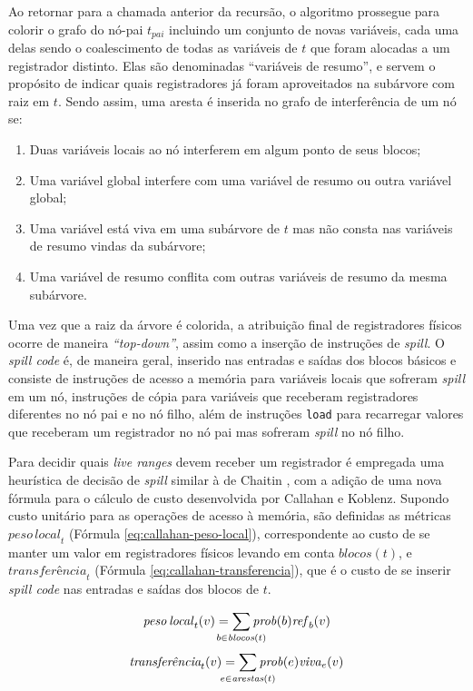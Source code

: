 \documentclass[
	12pt,				%
	openright,			%
	twoside,			%
	a4paper,			%
	tcc,			%
	]{ABNT-DC-UEL}
\begin{document}
Ao retornar para a chamada anterior da recursão, o algoritmo prossegue para colorir o grafo do nó-pai $t_{pai}$ incluindo um conjunto de novas variáveis, cada uma delas sendo o coalescimento de todas as variáveis de $t$ que foram alocadas a um registrador distinto. Elas são denominadas ``variáveis de resumo'', e servem o propósito de indicar quais registradores já foram aproveitados na subárvore com raiz em $t$. Sendo assim, uma aresta é inserida no grafo de interferência de um nó se:
\begin{enumerate}
    \item Duas variáveis locais ao nó interferem em algum ponto de seus blocos;
    \item Uma variável global interfere com uma variável de resumo ou outra variável global;
    \item Uma variável está viva em uma subárvore de $t$ mas não consta nas variáveis de resumo vindas da subárvore;
    \item Uma variável de resumo conflita com outras variáveis de resumo da mesma subárvore.
\end{enumerate}

Uma vez que a raiz da árvore é colorida, a atribuição final de registradores  físicos ocorre de maneira \textit{``top-down''}, assim como a inserção de instruções de \textit{spill}. O \textit{spill code} é, de maneira geral, inserido nas entradas e saídas dos blocos básicos e consiste de instruções de acesso a memória para variáveis locais que sofreram \textit{spill} em um nó, instruções de cópia para variáveis que receberam registradores diferentes no nó pai e no nó filho, além de instruções \texttt{load} para recarregar valores que receberam um registrador no nó pai mas sofreram \textit{spill} no nó filho.

Para decidir quais \textit{live ranges} devem receber um registrador é empregada uma heurística de decisão de \textit{spill} similar à de Chaitin \cite{chaitin:82}, com a adição de uma nova fórmula para o cálculo de custo desenvolvida por Callahan e Koblenz. Supondo custo unitário para as operações de acesso à memória, são definidas as métricas $\mathit{peso\,local}_t$ (Fórmula \ref{eq:callahan-peso-local}), correspondente ao custo de se manter um valor em registradores físicos levando em conta $\mathit{blocos}(t)$, e $\textit{transferência}_t$ (Fórmula \ref{eq:callahan-transferencia}), que é o custo de se inserir \textit{spill code} nas entradas e saídas dos blocos de $t$.

\begin{equation}
    \mathit{peso\,local}_t(v) = \sum_{\mathclap{b \in \mathit{blocos}(t)}} \mathit{prob}(b) \mathit{ref}_b(v)
    \label{eq:callahan-peso-local}
\end{equation}
\begin{equation}
    \textit{transferência}_t(v) = \sum_{\mathclap{e \in \mathit{arestas}(t)}} \mathit{prob}(e) \mathit{viva}_e(v)
    \label{eq:callahan-transferencia}
\end{equation}
\end{document}

